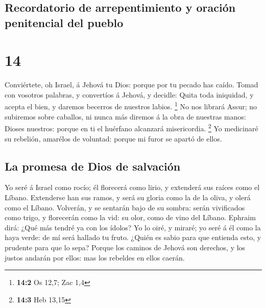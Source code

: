 \hypertarget{recordatorio-de-arrepentimiento-y-oraciuxf3n-penitencial-del-pueblo}{%
\subsection{Recordatorio de arrepentimiento y oración penitencial del
pueblo}\label{recordatorio-de-arrepentimiento-y-oraciuxf3n-penitencial-del-pueblo}}

\hypertarget{section-13}{%
\section{14}\label{section-13}}

 Conviértete, oh Israel, á Jehová tu Dios: porque por tu
pecado has caído.  Tomad con vosotros palabras, y
convertíos á Jehová, y decidle: Quita toda iniquidad, y acepta el bien,
y daremos becerros de nuestros labios. \footnote{\textbf{14:2} Os 12,7;
  Zac 1,4}  No nos librará Assur; no subiremos sobre
caballos, ni nunca más diremos á la obra de nuestras manos: Dioses
nuestros: porque en ti el huérfano alcanzará misericordia. \footnote{\textbf{14:3}
  Heb 13,15}  Yo medicinaré su rebelión, amarélos de
voluntad: porque mi furor se apartó de ellos.

\hypertarget{la-promesa-de-dios-de-salvaciuxf3n}{%
\subsection{La promesa de Dios de
salvación}\label{la-promesa-de-dios-de-salvaciuxf3n}}

 Yo seré á Israel como rocío; él florecerá como lirio, y
extenderá sus raíces como el Líbano.  Extenderse han sus
ramos, y será su gloria como la de la oliva, y olerá como el Líbano.
 Volverán, y se sentarán bajo de su sombra: serán
vivificados como trigo, y florecerán como la vid: su olor, como de vino
del Líbano.  Ephraim dirá: ¿Qué más tendré ya con los
ídolos? Yo lo oiré, y miraré; yo seré á él como la haya verde: de mí
será hallado tu fruto.  ¿Quién es sabio para que entienda
esto, y prudente para que lo sepa? Porque los caminos de Jehová son
derechos, y los justos andarán por ellos: mas los rebeldes en ellos
caerán.
